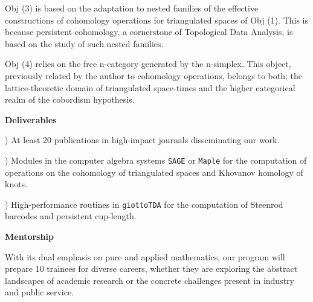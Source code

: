 \documentclass[12pt]{article}
\begin{document}
	\smallskip Obj (3) is based on the adaptation to nested families of the effective constructions of cohomology operations for triangulated spaces of Obj (1). This is because persistent cohomology, a cornerstone of Topological Data Analysis, is based on the study of such nested families.

	\smallskip Obj (4) relies on the free n-category generated by the n-simplex. This object, previously related by the author to cohomology operations, belongs to both; the lattice-theoretic domain of triangulated space-times and the higher categorical realm of the cobordism hypothesis.

	\smallskip\textbf{Deliverables}

	) At least 20 publications in high-impact journals disseminating our work.

	) Modules in the computer algebra systems \texttt{SAGE} or \texttt{Maple} for the computation of operations on the cohomology of triangulated spaces and Khovanov homology of knots.

	) High-performance routines in \texttt{giottoTDA} for the computation of Steenrod barcodes and persistent cup-length.

	\smallskip\textbf{Mentorship}

	\smallskip With its dual emphasis on pure and applied mathematics, our program will prepare 10 trainees for diverse careers, whether they are exploring the abstract landscapes of academic research or the concrete challenges present in industry and public service.
\end{document}

